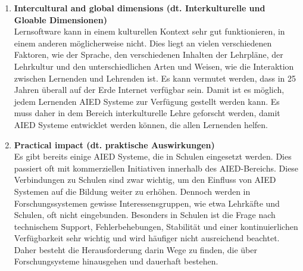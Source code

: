 \begin{enumerate}
      \item \textbf{Intercultural and global dimensions (dt. Interkulturelle und Gloable Dimensionen)} \\
            Lernsoftware kann in einem kulturellen Kontext sehr gut funktionieren, in einem anderen möglicherweise nicht. Dies liegt an vielen verschiedenen Faktoren, wie der Sprache, den verschiedenen Inhalten der Lehrpläne, der Lehrkultur und den unterschiedlichen Arten und Weisen, wie die Interaktion zwischen Lernenden und Lehrenden ist. Es kann vermutet werden, dass in 25 Jahren überall auf der Erde Internet verfügbar sein. Damit ist es möglich, jedem Lernenden AIED Systeme zur Verfügung gestellt werden kann. Es muss daher in dem Bereich interkulturelle Lehre geforscht werden, damit AIED Systeme entwicklet werden können, die allen Lernenden helfen. \cite[S. 9f]{Pinkwart.2016}

      \item \textbf{Practical impact (dt. praktische Auswirkungen)} \\
            Es gibt bereits einige AIED Systeme, die in Schulen eingesetzt werden. Dies passiert oft mit kommerziellen Initiativen innerhalb des AIED-Bereichs.
            Diese Verbindungen zu Schulen sind zwar wichtig, um den Einfluss von AIED Systemen auf die Bildung weiter zu erhöhen. Dennoch werden in Forschungssystemen gewisse Interessensgruppen, wie etwa Lehrkäfte und Schulen, oft nicht eingebunden.
            Besonders in Schulen ist die Frage nach technischem Support, Fehlerbehebungen, Stabilität und einer kontinuierlichen Verfügbarkeit sehr wichtig und wird häufiger nicht ausreichend beachtet.
            Daher besteht die Herausforderung darin Wege zu finden, die über Forschungsysteme hinausgehen und dauerhaft bestehen. \cite[S. 10]{Pinkwart.2016}


\end{enumerate}
